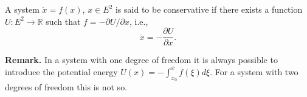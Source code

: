 A system $\ddot{x} = f(x)$, $x \in E^2$ is said to be conservative if there exists a function $U: E^2 \to \mathbb{R}$ such that $f = -\partial U / \partial x$, i.e.,
$$\ddot{x} = -\frac{\partial U}{\partial x}.$$

\textbf{Remark.} In a system with one degree of freedom it is always possible to introduce the potential energy $U(x) = -\int_{x_0}^x f(\xi)d\xi$. For a system with two degrees of freedom this is not so.
